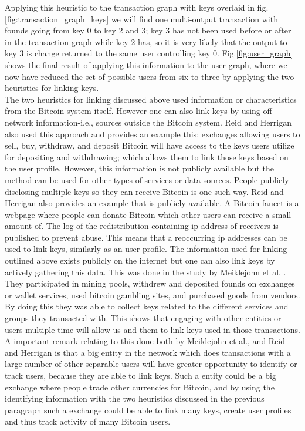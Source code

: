 Applying this heuristic to the transaction graph with keys overlaid in fig.\ref{fig:transaction_graph_keys} we will find one multi-output transaction with founds going from key 0 to key 2 and 3; key 3 has not been used before or after in the transaction graph while key 2 has, so it is very likely that the output to key 3 is change returned to the same user controlling key 0. Fig.\ref{fig:user_graph} shows the final result of applying this information to the user graph, where we now have reduced the set of possible users from six to three by applying the two heuristics for linking keys.
\\

The two heuristics for linking discussed above used information or characteristics from the Bitcoin system itself. However one can also link keys by using off-network information-i.e., sources outside the Bitcoin system.
Reid and Herrigan \cite{reid2013analysis} also used this approach and provides an example this: exchanges allowing users to sell, buy, withdraw, and deposit Bitcoin will have access to the keys users utilize for depositing and withdrawing; which allows them to link those keys based on the user profile. However, this information is not publicly available but the method can be used for other types of services or data sources. People publicly disclosing multiple keys so they can receive Bitcoin is one such way. Reid and Herrigan \cite{reid2013analysis} also provides an example that is publicly available. A Bitcoin faucet is a webpage where people can donate Bitcoin which other users can receive a small amount of. The log of the redistribution containing ip-address of receivers is published to prevent abuse. This means that a reoccurring ip addresses can be used to link keys, similarly as an user profile. The information used for linking outlined above exists publicly on the internet but one can also link keys by actively gathering this data. 
This was done in the study by Meiklejohn et al. \cite{meiklejohn2013fistful}. They participated in mining pools, withdrew and deposited founds on exchanges or wallet services, used bitcoin gambling sites, and purchased goods from vendors. By doing this they was able to collect keys related to the different services and groups they transacted with. 
This shows that engaging with other entities or users multiple time will allow us and them to link keys used in those transactions.
A important remark relating to this done both by Meiklejohn et al.\cite{meiklejohn2013fistful}, and Reid and Herrigan \cite{reid2013analysis} is that a big entity in the network which does transactions with a large number of other separable users will have greater opportunity to identify or track users, because they are able to link keys. Such a entity could be a big exchange where people trade other currencies for Bitcoin, and by using the identifying information with the two heuristics discussed in the previous paragraph such a exchange could be able to link many keys, create user profiles and thus track activity of many Bitcoin users.
\\

